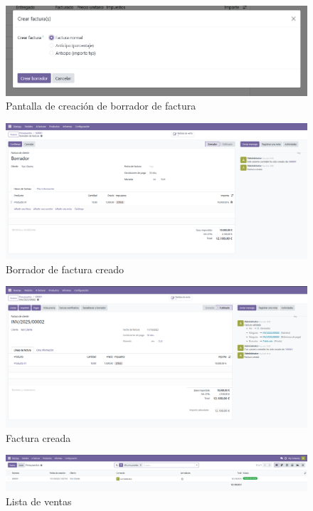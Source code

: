 \documentclass[a4paper,12pt]{article}
\begin{document}
\begin{figure}[h!]
    \centering
    \includegraphics[width=1\textwidth]{pr2odoo44-crearBorradorFactura.png}
    \caption{Pantalla de creación de borrador de factura}
\end{figure}
\FloatBarrier

\begin{figure}[h!]
    \centering
    \includegraphics[width=1\textwidth]{pr2odoo45-borradorCreado.png}
    \caption{Borrador de factura creado}
\end{figure}
\FloatBarrier

\begin{figure}[h!]
    \centering
    \includegraphics[width=1\textwidth]{pr2odoo46-facturaCreada.png}
    \caption{Factura creada}
\end{figure}
\FloatBarrier

\begin{figure}[h!]
    \centering
    \includegraphics[width=1\textwidth]{pr2odoo47-listaVentas.png}
    \caption{Lista de ventas}
\end{figure}
\FloatBarrier
\end{document}
